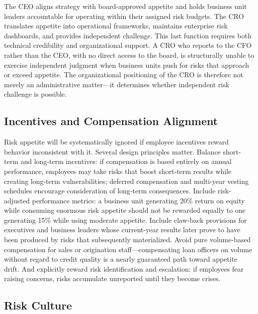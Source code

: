 \documentclass[11pt,openany]{book}
\begin{document}
The CEO aligns strategy with board-approved appetite and holds business unit
leaders accountable for operating within their assigned risk budgets. The CRO
translates appetite into operational frameworks, maintains enterprise risk
dashboards, and provides independent challenge. This last function requires both
technical credibility and organizational support. A CRO who reports to the CFO
rather than the CEO, with no direct access to the board, is structurally unable
to exercise independent judgment when business units push for risks that approach
or exceed appetite. The organizational positioning of the CRO is therefore not
merely an administrative matter---it determines whether independent risk challenge
is possible.

\subsection{Incentives and Compensation Alignment}
\label{subsec:incentives}

Risk appetite will be systematically ignored if employee incentives reward
behavior inconsistent with it. Several design principles matter. Balance short-
term and long-term incentives: if compensation is based entirely on annual
performance, employees may take risks that boost short-term results while
creating long-term vulnerabilities; deferred compensation and multi-year vesting
schedules encourage consideration of long-term consequences. Include risk-
adjusted performance metrics: a business unit generating 20\% return on equity
while consuming enormous risk appetite should not be rewarded equally to one
generating 15\% while using moderate appetite. Include claw-back provisions for
executives and business leaders whose current-year results later prove to have
been produced by risks that subsequently materialized. Avoid pure volume-based
compensation for sales or origination staff---compensating loan officers on
volume without regard to credit quality is a nearly guaranteed path toward
appetite drift. And explicitly reward risk identification and escalation: if
employees fear raising concerns, risks accumulate unreported until they become
crises.

\subsection{Risk Culture}
\label{subsec:risk-culture}
\end{document}
